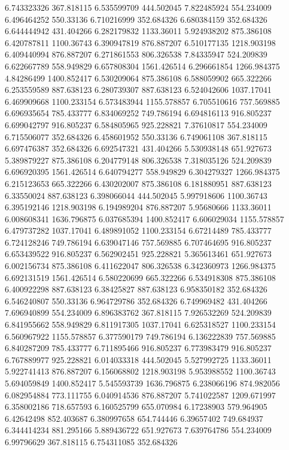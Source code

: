 6.743323326	367.818115
6.535599709	444.502045
7.822485924	554.234009
6.496464252	550.33136
6.710216999	352.684326
6.680384159	352.684326
6.644444942	431.404266
6.282179832	1133.36011
5.924938202	875.386108
6.420787811	1100.36743
6.390947819	876.887207
6.510177135	1218.903198
6.409440994	876.887207
6.271861553	806.326538
7.84335947	524.209839
6.622667789	558.949829
6.657808304	1561.426514
6.296661854	1266.984375
4.84286499	1400.852417
6.530209064	875.386108
6.588059902	665.322266
6.253559589	887.638123
6.280739307	887.638123
6.524042606	1037.17041
6.469909668	1100.233154
6.573483944	1155.578857
6.705510616	757.569885
6.696935654	785.433777
6.834069252	749.786194
6.694816113	916.805237
6.699042797	916.805237
6.584805965	925.228821
7.37610817	554.234009
6.715506077	352.684326
6.458601952	550.33136
6.749061108	367.818115
6.697476387	352.684326
6.692547321	431.404266
5.530938148	651.927673
5.389879227	875.386108
6.204779148	806.326538
7.318035126	524.209839
6.696920395	1561.426514
6.640794277	558.949829
6.304279327	1266.984375
6.215123653	665.322266
6.430202007	875.386108
6.181880951	887.638123
6.33550024	887.638123
6.398066044	444.502045
5.997918606	1100.36743
6.395192146	1218.903198
6.194989204	876.887207
5.95680666	1133.36011
6.008608341	1636.796875
6.037685394	1400.852417
6.606029034	1155.578857
6.479737282	1037.17041
6.489891052	1100.233154
6.67214489	785.433777
6.724128246	749.786194
6.639047146	757.569885
6.707464695	916.805237
6.653439522	916.805237
6.562902451	925.228821
5.365613461	651.927673
6.002156734	875.386108
6.411622047	806.326538
6.342360973	1266.984375
6.692131519	1561.426514
6.580220699	665.322266
6.534918308	875.386108
6.400922298	887.638123
6.38425827	887.638123
6.958350182	352.684326
6.546240807	550.33136
6.964729786	352.684326
6.749969482	431.404266
7.696940899	554.234009
6.896383762	367.818115
7.926532269	524.209839
6.841955662	558.949829
6.811917305	1037.17041
6.625318527	1100.233154
6.560967922	1155.578857
6.377590179	749.786194
6.136222839	757.569885
6.840287209	785.433777
6.711895466	916.805237
6.773983479	916.805237
6.767889977	925.228821
6.014033318	444.502045
5.527992725	1133.36011
5.922741413	876.887207
6.156068802	1218.903198
5.953988552	1100.36743
5.694059849	1400.852417
5.545593739	1636.796875
6.238066196	874.982056
6.082954884	773.111755
6.040914536	876.887207
5.741022587	1209.671997
6.358002186	718.657593
6.160525799	655.070984
6.17238903	579.964905
6.42642498	852.403687
6.380997658	654.744446
6.39657402	749.684937
6.344414234	881.295166
5.889436722	651.927673
7.639764786	554.234009
6.99796629	367.818115
6.754311085	352.684326
